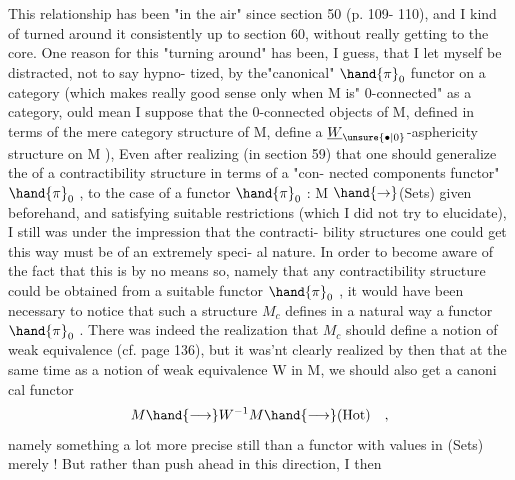 
This relationship has been "in the air"  since section 50 (p. 109-%
110),  and I kind of turned around it consistently up to section 60,
without really getting to the core.  One reason for this "turning around"
has been,  I guess,  that I let myself be distracted,  not to say hypno-%
tized,  by the"canonical" $\hand{\pi}_0$ functor on a category (which makes really
good sense only when M is" 0-connected" as a category,  
ould mean  I suppose that the 0-connected objects of M,  defined in terms
of the mere category structure of M,  define a $\underline{W}_{\unsure{\bullet|0}}$-asphericity structure
on M ),  Even after realizing (in section 59)  that one should generalize
the   of a contractibility structure in terms of  a "con-%
nected components functor" $\hand{\pi}_0$ ,  to the case of a functor $\hand{\pi}_0$ : M $\hand{\rightarrow}$(Sets)
given beforehand,  and satisfying suitable restrictions (which I did not
try to elucidate),  I still was under the impression that the contracti-%
bility structures one could get this  way must be of an extremely speci-%
al nature.  In order to become aware of the fact that this is by no means
so,  namely that any contractibility structure could be obtained from a
suitable functor $\hand{\pi}_0$ ,  it would have been necessary to notice that such
a structure $M_c$  defines in a natural way a functor $\hand{\pi}_0$ .  There was 
indeed the realization that $M_c$ should  define a notion of weak equivalence
(cf. page 136),  but it was'nt clearly realized by then that at the same
time as a notion of weak equivalence W in M,  we should also get a canoni%
cal functor
\[ M \hand{\longrightarrow} W^{-1}M \hand{\longrightarrow} \text{(Hot)} \quad , \]
namely something a lot more precise still than a functor with values in
(Sets)  merely !  But rather than push ahead in this direction, I then
